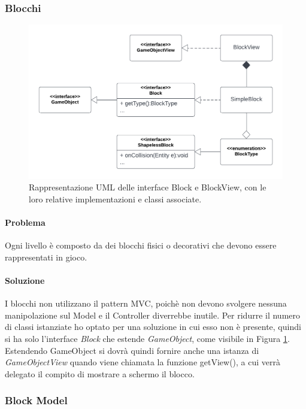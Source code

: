 \documentclass[a4paper,12pt]{report}
\begin{document}
    \subsubsection{Blocchi}

    \begin{figure}[H]
        \centering{}
        \includegraphics[scale=0.8] {img/block.png}
        \caption{Rappresentazione UML delle interface Block e BlockView, con le loro relative implementazioni e classi associate.}
        \label{img:block}
    \end{figure}

    \paragraph{Problema} Ogni livello è composto da dei blocchi fisici o decorativi che devono essere rappresentati in gioco.

    \paragraph{Soluzione} I blocchi non utilizzano il pattern MVC, poichè non devono svolgere nessuna manipolazione sul Model e il Controller diverrebbe inutile.
    Per ridurre il numero di classi istanziate ho optato per una soluzione in cui esso non è presente, quindi si ha solo l'interface \emph{Block} che estende \emph{GameObject}, come visibile in Figura \ref{img:block}.
    Estendendo GameObject si dovrà quindi fornire anche una istanza di \emph{GameObjectView} quando viene chiamata la funzione getView(), a cui verrà delegato il compito di mostrare a schermo il blocco.

    \subsubsection{Block Model}
\end{document}
